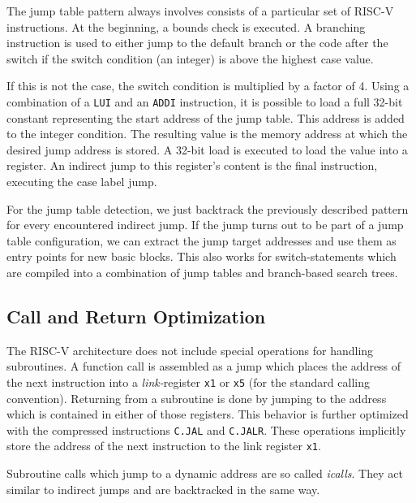 \documentclass[course=eragp]{aspdoc}
\begin{document}
\par

The jump table pattern always involves consists of a particular set of RISC-V instructions.
At the beginning, a bounds check is executed. A branching instruction is used to either jump to the
default branch or the code after the switch if the switch condition (an integer) is above the
highest case value.

\par

If this is not the case, the switch condition is multiplied by a factor of 4.
Using a combination of a \texttt{LUI} and an \texttt{ADDI} instruction, it is possible to load a full
32-bit constant\cite{rvspec} representing the start address of the jump table.
This address is added to the integer condition. The resulting value is the memory address
at which the desired jump address is stored. A 32-bit load is executed to load the value into a
register. An indirect jump to this register's content is the final instruction, executing the case
label jump.

\par

For the jump table detection, we just backtrack the previously described pattern for every
encountered indirect jump. If the jump turns out to be part of a jump table configuration, we can
extract the jump target addresses and use them as entry points for new basic blocks. This also works
for switch-statements which are compiled into a combination of jump tables and branch-based search
trees.

\subsection{Call and Return Optimization}
The RISC-V architecture does not include special operations for handling subroutines. A function call
is assembled as a jump which places the address of the next instruction into a \emph{link-}register
\texttt{x1} or \texttt{x5} (for the standard calling convention).\cite{rvspec} Returning from a
subroutine is done by jumping to the address which is contained in either of those registers. This
behavior is further optimized with the compressed instructions \texttt{C.JAL} and
\texttt{C.JALR}. These operations implicitly store the address of the next instruction
to the link register \texttt{x1}.\cite{rvspec}

\par

Subroutine calls which jump to a dynamic address are so called \emph{icalls}. They act
similar to indirect jumps and are backtracked in the same way.
\end{document}
